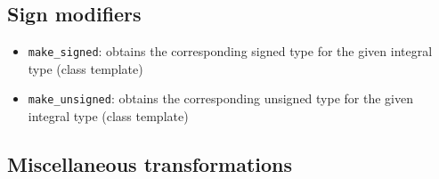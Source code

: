 \documentclass{report}
\begin{document}
        \bigbreak \noindent 
        \subsection{Sign modifiers}
        \begin{itemize}
            \item \texttt{make\_signed}: obtains the corresponding signed type for the given integral type (class template)
            \item \texttt{make\_unsigned}: obtains the corresponding unsigned type for the given integral type (class template)
        \end{itemize}

        \pagebreak 
        \subsection{Miscellaneous transformations}
        \bigbreak \noindent 
\end{document}
